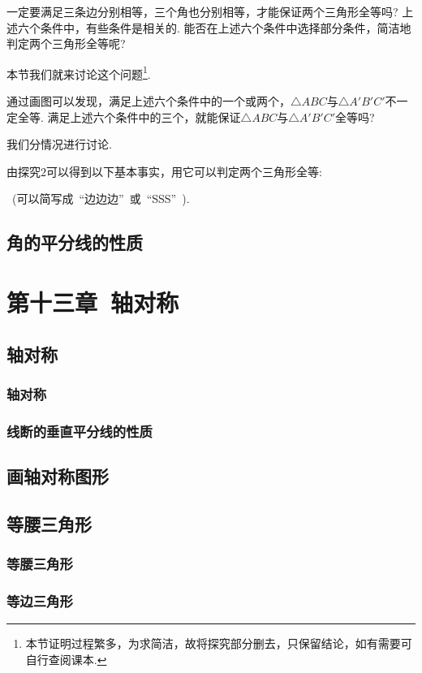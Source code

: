 \documentclass[UTF8,fontset=macnew]{book} %
\begin{document}
			一定要满足三条边分别相等，三个角也分别相等，才能保证两个三角形全等吗? 上述六个条件中，有些条件是相关的. 能否在上述六个条件中选择部分条件，简洁地判定两个三角形全等呢?
			
			本节我们就来讨论这个问题\footnote{本节证明过程繁多，为求简洁，故将探究部分删去，只保留结论，如有需要可自行查阅课本.}.
			
			通过画图可以发现，满足上述六个条件中的一个或两个，$\triangle ABC$与$\triangle A'B'C'$不一定全等. 满足上述六个条件中的三个，就能保证$\triangle ABC$与$\triangle A'B'C'$全等吗?
			
			我们分情况进行讨论.
			
			由探究$2$可以得到以下基本事实，用它可以判定两个三角形全等:
			
			\textcolor[RGB]{4,165,218}{}\ (可以简写成\ “边边边”\ 或\ “SSS”\ ).
		\section{角的平分线的性质}
		
	\chapter{第十三章\ 轴对称}
		\section{轴对称}
			\subsection{轴对称}
			
			\subsection{线断的垂直平分线的性质}
			
		\section{画轴对称图形}
		
		\section{等腰三角形}
			\subsection{等腰三角形}
			
			\subsection{等边三角形}
\end{document}
